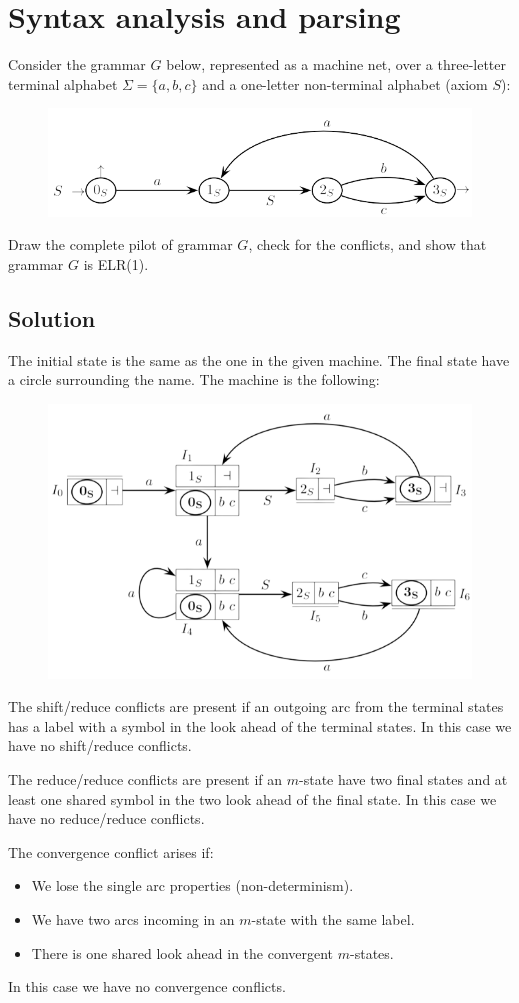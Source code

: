 \documentclass[12pt, a4paper]{report}
\newtheorem[style=M, bodystyle=\normalfont]{theorem}{Theorem}
\newtheorem[style=M, bodystyle=\normalfont]{corollary}{Corollary}
\newtheorem[style=M, bodystyle=\normalfont]{lemma}{Lemma}
\newtheorem[style=M, bodystyle=\normalfont]{definition}{Definition}
\begin{document}
    \newpage
    \section{Syntax analysis and parsing}
    Consider the grammar $G$ below, represented as a machine net, over a three-letter terminal alphabet $\Sigma=\{a,b,c\}$ and a one-letter non-terminal alphabet (axiom $S$):
    \begin{figure}[H]
        \centering
        \includegraphics[width=0.5\linewidth]{images/mnet.png}
    \end{figure}
    Draw the complete pilot of grammar $G$, check for the conflicts, and show that grammar $G$ is ELR(1).
    \subsection*{Solution}
    The initial state is the same as the one in the given machine. The final state have a circle surrounding the name. The machine is the following: 
    \begin{figure}[H]
        \centering
        \includegraphics[width=0.6\linewidth]{images/pilot.png}
    \end{figure} 
    The shift/reduce conflicts are present if an outgoing arc from the terminal states has a label with a symbol in the look ahead of the terminal states. 
    In this case we have no shift/reduce conflicts. 

    The reduce/reduce conflicts are present if an $m$-state have two final states and at least one shared symbol in the two look ahead of the final state. 
    In this case we have no reduce/reduce conflicts. 

    The convergence conflict arises if: 
    \begin{itemize}
        \item We lose the single arc properties (non-determinism). 
        \item We have two arcs incoming in an $m$-state with the same label. 
        \item There is one shared look ahead in the convergent $m$-states. 
    \end{itemize}
    In this case we have no convergence conflicts. 
\end{document}
